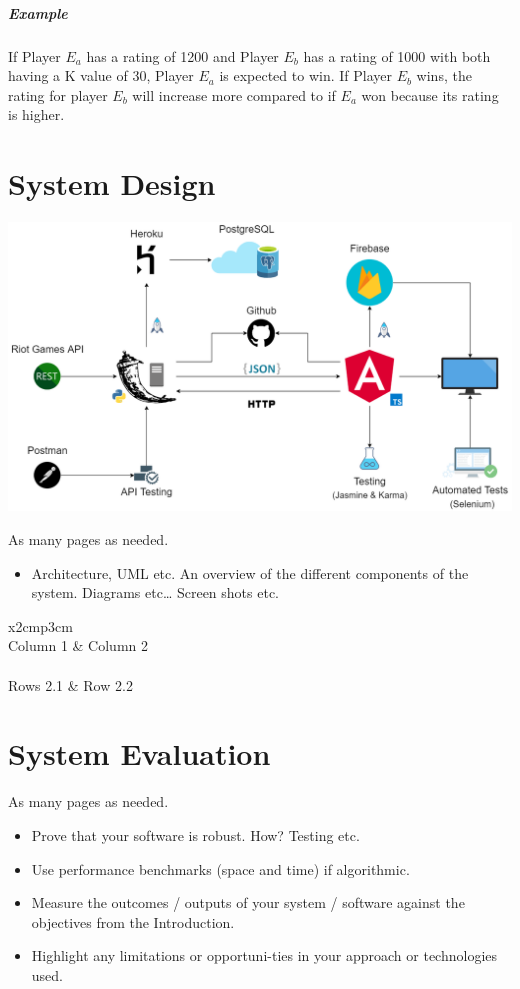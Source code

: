 \paragraph{Example} If Player $E_a$ has a rating of 1200 and Player $E_b$ has a rating of 1000 with both having a K value of 30, Player $E_a$ is expected to win. If Player $E_b$ wins, the rating for player $E_b$ will increase more compared to if $E_a$ won because its rating is higher.\vfill

\chapter{System Design}
\begin{center}    
	\includegraphics[width=\textwidth,height=\textheight,keepaspectratio]{img/Architecture.png}
\end{center}
As many pages as needed.
\begin{itemize}
	\item Architecture, UML etc. An overview of the different components of the system. Diagrams etc… Screen shots etc.
\end{itemize}

\begin{table}[h]
	\centering
	\begin{tabular}{x{2cm}p{3cm}}
		\toprule \\
		Column 1 & Column 2 \\
		\midrule \\
		Rows 2.1 & Row 2.2 \\
		\bottomrule
	\end{tabular}
	\caption{A table.}
	\label{table:mytable}
\end{table}

\chapter{System Evaluation}
As many pages as needed.
\begin{itemize}
	\item Prove that your software is robust. How? Testing etc. 
	\item Use performance benchmarks (space and time) if algorithmic.
	\item Measure the outcomes / outputs of your system / software against the objectives from the Introduction.
	\item Highlight any limitations or opportuni-ties in your approach or technologies used.
\end{itemize}

